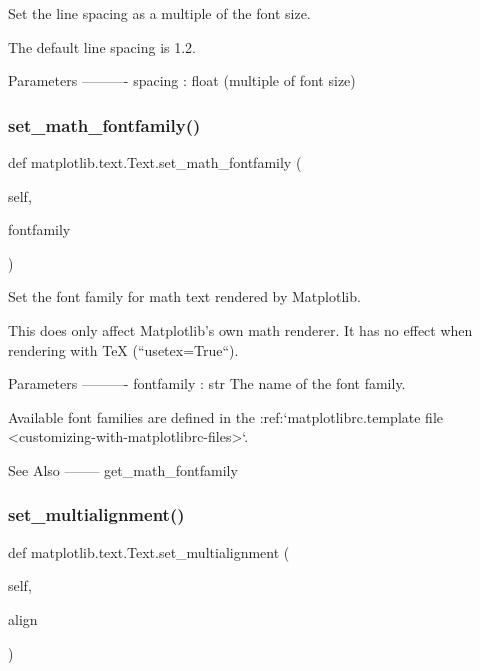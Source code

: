 \begin{DoxyVerb}Set the line spacing as a multiple of the font size.

The default line spacing is 1.2.

Parameters
----------
spacing : float (multiple of font size)
\end{DoxyVerb}
 \mbox{\label{classmatplotlib_1_1text_1_1Text_a864da9a49be2a65fed6ec3406a4cf659}} 
\subsubsection{\texorpdfstring{set\+\_\+math\+\_\+fontfamily()}{set\_math\_fontfamily()}}
{\footnotesize\ttfamily def matplotlib.\+text.\+Text.\+set\+\_\+math\+\_\+fontfamily (\begin{DoxyParamCaption}\item[{}]{self,  }\item[{}]{fontfamily }\end{DoxyParamCaption})}

\begin{DoxyVerb}Set the font family for math text rendered by Matplotlib.

This does only affect Matplotlib's own math renderer. It has no effect
when rendering with TeX (``usetex=True``).

Parameters
----------
fontfamily : str
    The name of the font family.

    Available font families are defined in the
    :ref:`matplotlibrc.template file
    <customizing-with-matplotlibrc-files>`.

See Also
--------
get_math_fontfamily
\end{DoxyVerb}
 \mbox{\label{classmatplotlib_1_1text_1_1Text_a394010ae442a3eb9603b56b1bf143293}} 
\subsubsection{\texorpdfstring{set\+\_\+multialignment()}{set\_multialignment()}}
{\footnotesize\ttfamily def matplotlib.\+text.\+Text.\+set\+\_\+multialignment (\begin{DoxyParamCaption}\item[{}]{self,  }\item[{}]{align }\end{DoxyParamCaption})}

